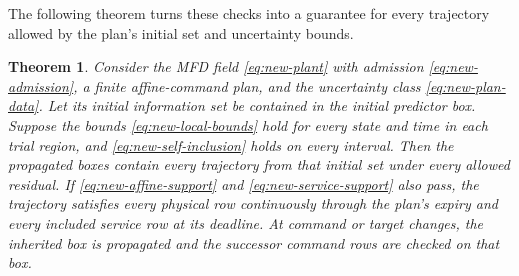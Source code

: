 \documentclass[preprint,12pt]{elsarticle}
\newtheorem{theorem}{Theorem}
\begin{document}
The following theorem turns these checks into a guarantee for every
trajectory allowed by the plan's initial set and uncertainty bounds.

\begin{theorem}
\label{thm:new-plan-enclosure}
Consider the MFD field \eqref{eq:new-plant} with admission
\eqref{eq:new-admission}, a finite affine-command plan, and the uncertainty
class \eqref{eq:new-plan-data}. Let its initial information set be contained
in the initial predictor box. Suppose the bounds
\eqref{eq:new-local-bounds} hold for every state and time in each trial
region, and
\eqref{eq:new-self-inclusion} holds on every interval. Then the propagated
boxes contain every trajectory from that initial set under every allowed
residual. If \eqref{eq:new-affine-support} and
\eqref{eq:new-service-support} also pass, the trajectory satisfies every
physical row continuously through the plan's expiry and every included
service row at its deadline. At command or target changes, the inherited box
is propagated and the successor command rows are checked on that box.
\end{theorem}
\end{document}
